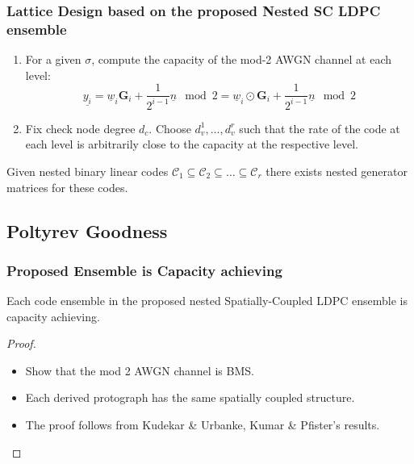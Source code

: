 \documentclass[10pt]{beamer}
\newcommand{\mc}{\mathcal}
\begin{document}
\begin{frame}\frametitle{Lattice Design based on the proposed Nested SC LDPC ensemble}
\begin{enumerate}
\item For a given $\sigma$, compute the capacity of the mod-2 AWGN channel at each level:
		$$
         \underline{y_{i}}= \underline{w}_i \mathbf{G}_i +\frac{1}{2^{i-1}} \underline{n}\mod 2=\underline{w}_i \odot \mathbf{G}_i + \boxed{\frac{1}{2^{i-1}}\underline{n} \mod 2}
         $$
         \vspace{0.08in}

\item Fix check node degree $d_{c}$. Choose $d_{v}^{1},\ldots ,d_{v}^{r}$ such that the rate of the code at each level is arbitrarily close to the capacity at the respective level.
\end{enumerate}
\pause
\begin{lemma}\label{lemma:nested_G}
    Given nested binary linear codes $\mc{C}_{1}\subseteq \mc{C}_{2}\subseteq\ldots \subseteq\mc{C}_{r}$ there exists nested generator matrices for these codes.
\end{lemma}
\end{frame}

\subsection{Poltyrev Goodness}
\begin{frame}\frametitle{Proposed Ensemble is Capacity achieving}
\begin{theorem}
Each code ensemble in the proposed nested Spatially-Coupled LDPC ensemble is capacity achieving. 
\end{theorem}    
\begin{proof}
\begin{itemize}
        \item Show that the mod 2 AWGN channel is BMS.
        \item Each derived protograph has the same spatially coupled structure.
        \item The proof follows from Kudekar \& Urbanke, Kumar \& Pfister's  results.
    \end{itemize}
\end{proof}
\end{frame}
\end{document}
